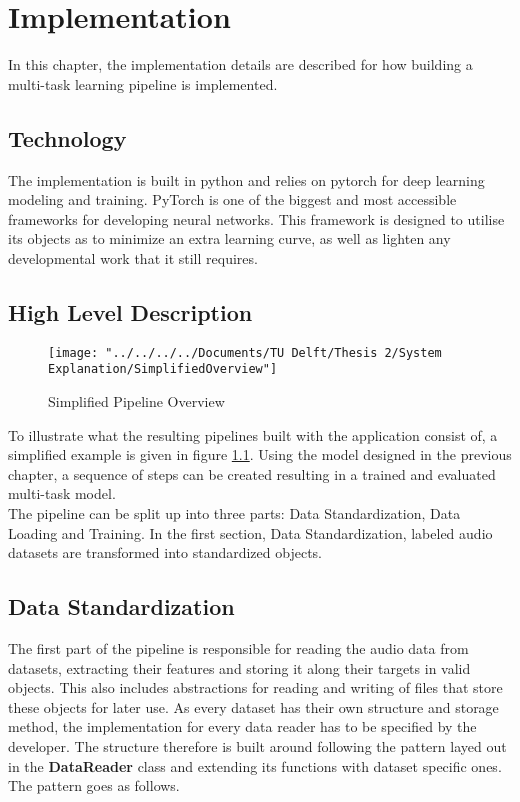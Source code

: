 \chapter{Implementation} \label{Impl}

In this chapter, the implementation details are described for how building a multi-task learning pipeline is implemented. 

\section{Technology} \label{Impl:Technology}

The implementation is built in python and relies on pytorch \citep{paszke2019pytorch} for deep learning modeling and training. PyTorch is one of the biggest and most accessible frameworks for developing neural networks. This framework is designed to utilise its objects as to minimize an extra learning curve, as well as lighten any developmental work that it still requires. 


\section{High Level Description} \label{Impl:Description}

\begin{figure}
	\centering
	\texttt{[image: "../../../../Documents/TU Delft/Thesis 2/System Explanation/SimplifiedOverview"]}
	\caption{Simplified Pipeline Overview}
	\label{fig:simplifiedoverview}
\end{figure}

To illustrate what the resulting pipelines built with the application consist of, a simplified example is given in figure \ref{fig:simplifiedoverview}. Using the model designed in the previous chapter, a sequence of steps can be created resulting in a trained and evaluated multi-task model. \\

The pipeline can be split up into three parts: Data Standardization, Data Loading and Training. In the first section, Data Standardization, labeled audio datasets are transformed into standardized objects. 

\section{Data Standardization} \label{Impl:DataRead}


The first part of the pipeline is responsible for reading the audio data from datasets, extracting their features and storing it along their targets in valid objects. This also includes abstractions for reading and writing of files that store these objects for later use. As every dataset has their own structure and storage method, the implementation for every data reader has to be specified by the developer. The structure therefore is built around following the pattern layed out in the \textbf{DataReader} class and extending its functions with dataset specific ones. The pattern goes as follows. \\

